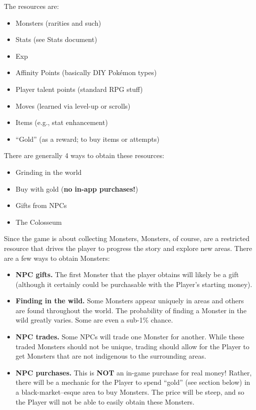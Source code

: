 

\begin{tldr}
	The resources are:
	\begin{itemize}
		\item{Monsters (rarities and such)}
		\item{Stats (see Stats document)}
		\item{Exp}
		\item{Affinity Points (basically DIY Pok\'{e}mon types)}
		\item{Player talent points (standard RPG stuff)}
		\item{Moves (learned via level-up or scrolls)}
		\item{Items (e.g., stat enhancement)}
		\item{``Gold'' (as a reward; to buy items or attempts)}
	\end{itemize}
	
	There are generally 4 ways to obtain these resources:
	\begin{itemize}
		\item{Grinding in the world}
		\item{Buy with gold (\textbf{no in-app purchases!})}
		\item{Gifts from NPCs}
		\item{The Colosseum}
	\end{itemize}
\end{tldr}

Since the game is about collecting Monsters, Monsters, of course, are a restricted resource that drives the player to progress the story and explore new areas. There are a few ways to obtain Monsters:
\begin{itemize}
	\item{\textbf{NPC gifts.} The first Monster that the player obtains will likely be a gift (although it certainly could be purchasable with the Player's starting money).}
	\item{\textbf{Finding in the wild.} Some Monsters appear uniquely in areas and others are found throughout the world. The probability of finding a Monster in the wild greatly varies. Some are even a sub-1\% chance.}
	\item{\textbf{NPC trades.} Some NPCs will trade one Monster for another. While these traded Monsters should not be unique, trading should allow for the Player to get Monsters that are not indigenous to the surrounding areas.}
	\item{\textbf{NPC purchases.} This is \textbf{NOT} an in-game purchase for real money! Rather, there will be a mechanic for the Player to spend ``gold'' (see section below) in a black-market--esque area to buy Monsters. The price will be steep, and so the Player will not be able to easily obtain these Monsters.}
\end{itemize}

